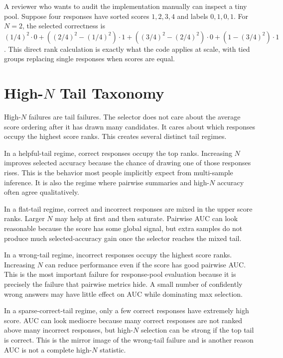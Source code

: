 A reviewer who wants to audit the implementation manually can inspect a tiny
pool. Suppose four responses have sorted scores $1,2,3,4$ and labels
$0,1,0,1$. For $N=2$, the selected correctness is
$(1/4)^2\cdot0 + ((2/4)^2-(1/4)^2)\cdot1 +
((3/4)^2-(2/4)^2)\cdot0 + (1-(3/4)^2)\cdot1$. This direct rank calculation
is exactly what the code applies at scale, with tied groups replacing single
responses when scores are equal.

\section[High-N Tail Taxonomy]{High-$N$ Tail Taxonomy}
\label{app:tail-taxonomy}

High-$N$ failures are tail failures. The selector does not care about the
average score ordering after it has drawn many candidates. It cares about
which responses occupy the highest score ranks. This creates several distinct
tail regimes.

In a helpful-tail regime, correct responses occupy the top ranks. Increasing
$N$ improves selected accuracy because the chance of drawing one of those
responses rises. This is the behavior most people implicitly expect from
multi-sample inference. It is also the regime where pairwise summaries and
high-$N$ accuracy often agree qualitatively.

In a flat-tail regime, correct and incorrect responses are mixed in the upper
score ranks. Larger $N$ may help at first and then saturate. Pairwise AUC can
look reasonable because the score has some global signal, but extra samples do
not produce much selected-accuracy gain once the selector reaches the mixed
tail.

In a wrong-tail regime, incorrect responses occupy the highest score ranks.
Increasing $N$ can reduce performance even if the score has good pairwise AUC.
This is the most important failure for response-pool evaluation because it is
precisely the failure that pairwise metrics hide. A small number of confidently
wrong answers may have little effect on AUC while dominating max selection.

In a sparse-correct-tail regime, only a few correct responses have extremely
high score. AUC can look mediocre because many correct responses are not ranked
above many incorrect responses, but high-$N$ selection can be strong if the
top tail is correct. This is the mirror image of the wrong-tail failure and is
another reason AUC is not a complete high-$N$ statistic.

